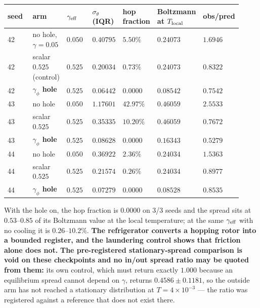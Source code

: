 \documentclass{article}
\begin{document}
\begin{table}[t]\centering\small
\begin{tabular}{p{0.131\linewidth}p{0.131\linewidth}p{0.131\linewidth}p{0.131\linewidth}p{0.131\linewidth}p{0.131\linewidth}p{0.131\linewidth}}
\toprule
seed & arm & $\gamma_{\rm eff}$ & $\sigma_\theta$ (IQR) & hop fraction & Boltzmann at $T_{\rm local}$ & obs/pred \\
\midrule
42 & no hole, $\gamma=0.05$ & $0.050$ & $0.40795$ & $5.50\%$ & $0.24073$ & $1.6946$ \\
42 & scalar $0.525$ (control) & $0.525$ & $0.20034$ & $0.73\%$ & $0.24073$ & $0.8322$ \\
42 & \textbf{$\gamma_\phi$ hole} & $0.525$ & $0.06442$ & \textbf{$0.0000$} & $0.08542$ & $0.7542$ \\
43 & no hole & $0.050$ & $1.17601$ & $42.97\%$ & $0.46059$ & $2.5533$ \\
43 & scalar $0.525$ & $0.525$ & $0.35335$ & $10.20\%$ & $0.46059$ & $0.7672$ \\
43 & \textbf{$\gamma_\phi$ hole} & $0.525$ & $0.08628$ & \textbf{$0.0000$} & $0.16343$ & $0.5279$ \\
44 & no hole & $0.050$ & $0.36922$ & $2.36\%$ & $0.24034$ & $1.5363$ \\
44 & scalar $0.525$ & $0.525$ & $0.21574$ & $0.26\%$ & $0.24034$ & $0.8977$ \\
44 & \textbf{$\gamma_\phi$ hole} & $0.525$ & $0.07279$ & \textbf{$0.0000$} & $0.08528$ & $0.8535$ \\
\bottomrule
\end{tabular}
\end{table}

With the hole on, the hop fraction is $0.0000$ on 3/3 seeds and the spread sits at $0.53$--$0.85$ of its Boltzmann value at the local temperature; at the same $\gamma_{\rm eff}$ with no cooling it is $0.26$--$10.2\%$. \textbf{The refrigerator converts a hopping rotor into a bounded register, and the laundering control shows that friction alone does not.} \textbf{The pre-registered stationary-spread comparison is void on these checkpoints and no in/out spread ratio may be quoted from them:} its own control, which must return exactly $1.000$ because an equilibrium spread cannot depend on $\gamma$, returns $0.4586\pm0.1181$, so the outside arm has not reached a stationary distribution at $T=4\times10^{-3}$ --- the ratio was registered against a reference that does not exist there.
\end{document}
